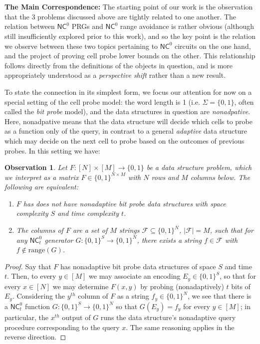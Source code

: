 \documentclass[11pt]{article}
\newtheorem*{observation*}{Observation}
\newcommand{\B}{\{0,1\}}
\newcommand{\rng}{\mathrm{range}}
\begin{document}
~\\~\\
{\bf \noindent The Main Correspondence:}
The starting point of our work is the observation that the 3 problems discussed above are tightly related to one another. The relation between $\mathsf{NC}^0$ PRGs and $\mathsf{NC}^0$ range avoidance is rather obvious (although still insufficiently explored prior to this work), and so the key point is the relation we observe between these two topics pertaining to $\mathsf{NC}^0$ circuits on the one hand, and the project of proving cell probe lower bounds on the other. This relationship follows directly from the definitions of the objects in question, and is more appropriately understood as a \emph{perspective shift} rather than a new result. 

To state the connection in its simplest form, we focus our attention for now on a special setting of the cell probe model: the word length is 1 (i.e. $\Sigma = \{0,1\}$, often called the \emph{bit probe} model), and the data structures in question are \emph{nonadpative}. Here, nonadpative means that the data structure will decide which cells to probe as a function only of the query, in contrast to a general \emph{adaptive} data structure which may decide on the next cell to probe based on the outcomes of previous probes. In this setting we have:
\begin{observation*}
Let $F: [N] \times [M] \to \B$ be a data structure problem, which we interpret as a matrix $F \in \B^{N \times M}$ with $N$ rows and $M$ columns below. The following are equivalent:
\begin{enumerate}
    \item $F$ has \emph{does not have} nonadaptive bit probe data structures with space complexity $S$ and time complexity $t$.
    \item The columns of $F$ are a set of $M$ strings $\mathcal{F} \subseteq \B^N$, $|\mathcal{F}|=M$, such that for any $\mathsf{NC}^0_t$ generator $G: \B^S \to \B^N$, there exists a string $f \in \mathcal{F}$ with $f \notin \rng(G)$.
\end{enumerate}
\end{observation*}
\begin{proof}
Say that $F$ has nonadaptive bit probe data structures of space $S$ and time $t$. Then, to every $y \in [M]$ we may associate an encoding $E_y \in \B^S$, so that for every $x \in [N]$ we may determine $F(x,y)$ by probing (nonadaptively) $t$ bits of $E_y$. Considering the $y^{th}$ column of $F$ as a string $f_y\in \B^N$, we see that there is a $\mathsf{NC}^0_t$ function $G: \B^S \to \B^N$ so that $G(E_y) = f_y$ for every $y\in [M]$; in particular, the $x^{th}$ output of $G$ runs the data structure's nonadaptive query procedure corresponding to the query $x$. The same reasoning applies in the reverse direction.
\end{proof}
\end{document}
